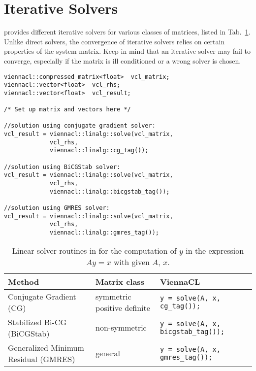 \section{Iterative Solvers} \label{sec:iterative-solvers}
{\ViennaCL} provides different iterative solvers for various classes of
matrices, listed in Tab.~\ref{tab:linear-solvers}. Unlike direct solvers, the
convergence of iterative solvers relies on certain properties of the system
matrix. Keep in mind that an iterative solver may fail to converge, especially
if the matrix is ill conditioned or a wrong solver is chosen.




\begin{lstlisting}
viennacl::compressed_matrix<float>  vcl_matrix;
viennacl::vector<float>  vcl_rhs;
viennacl::vector<float>  vcl_result;

/* Set up matrix and vectors here */

//solution using conjugate gradient solver:
vcl_result = viennacl::linalg::solve(vcl_matrix,
             vcl_rhs,
             viennacl::linalg::cg_tag());

//solution using BiCGStab solver:
vcl_result = viennacl::linalg::solve(vcl_matrix,
             vcl_rhs,
             viennacl::linalg::bicgstab_tag());

//solution using GMRES solver:
vcl_result = viennacl::linalg::solve(vcl_matrix,
             vcl_rhs,
             viennacl::linalg::gmres_tag());
\end{lstlisting}

\begin{table}[tb]
\begin{center}
\renewcommand{\arraystretch}{1.2}
\begin{tabular}{p{4cm}|p{3cm}|p{7.5cm}}
Method & Matrix class & ViennaCL\\
\hline
Conjugate Gradient (CG) & symmetric positive definite & \texttt{y = solve(A, x, cg\_tag());} \\
Stabilized Bi-CG (BiCGStab) & non-symmetric & \texttt{y = solve(A, x, bicgstab\_tag());} \\
Generalized Minimum Residual (GMRES) & general & \texttt{y = solve(A, x, gmres\_tag());} \\
\hline
\end{tabular}
\caption{Linear solver routines in {\ViennaCL} for the computation of $y$ in the expression $Ay = x$ with given $A$, $x$.}
\label{tab:linear-solvers}
\end{center}
\end{table}


